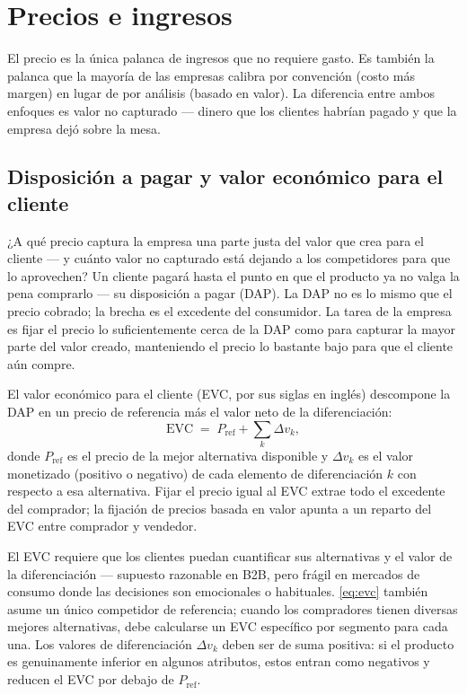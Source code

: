 \chapter{Precios e ingresos}\label{ch:pricing}


El precio es la única palanca de ingresos que no requiere gasto. Es también la palanca que la mayoría de las empresas calibra por convención (costo más margen) en lugar de por análisis (basado en valor). La diferencia entre ambos enfoques es valor no capturado --- dinero que los clientes habrían pagado y que la empresa dejó sobre la mesa.

\section{Disposición a pagar y valor económico para el cliente}\label{sec:evc}

¿A qué precio captura la empresa una parte justa del valor que crea para el cliente --- y cuánto valor no capturado está dejando a los competidores para que lo aprovechen? Un cliente pagará hasta el punto en que el producto ya no valga la pena comprarlo --- su disposición a pagar (DAP). La DAP no es lo mismo que el precio cobrado; la brecha es el excedente del consumidor. La tarea de la empresa es fijar el precio lo suficientemente cerca de la DAP como para capturar la mayor parte del valor creado, manteniendo el precio lo bastante bajo para que el cliente aún compre.

El valor económico para el cliente (EVC, por sus siglas en inglés) descompone la DAP en un precio de referencia más el valor neto de la diferenciación:
\begin{equation}\label{eq:evc}
  \mathrm{EVC} \;=\; P_{\text{ref}} + \sum_k \Delta v_k ,
\end{equation}
donde \(P_{\text{ref}}\) es el precio de la mejor alternativa disponible y \(\Delta v_k\) es el valor monetizado (positivo o negativo) de cada elemento de diferenciación \(k\) con respecto a esa alternativa. Fijar el precio igual al EVC extrae todo el excedente del comprador; la fijación de precios basada en valor apunta a un reparto del EVC entre comprador y vendedor.

El EVC requiere que los clientes puedan cuantificar sus alternativas y el valor de la diferenciación --- supuesto razonable en B2B, pero frágil en mercados de consumo donde las decisiones son emocionales o habituales. \cref{eq:evc} también asume un único competidor de referencia; cuando los compradores tienen diversas mejores alternativas, debe calcularse un EVC específico por segmento para cada una. Los valores de diferenciación \(\Delta v_k\) deben ser de suma positiva: si el producto es genuinamente inferior en algunos atributos, estos entran como negativos y reducen el EVC por debajo de \(P_{\text{ref}}\).

